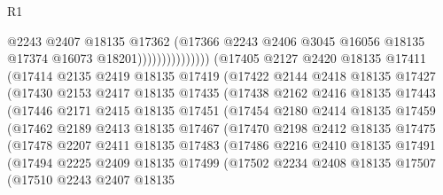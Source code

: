 \begin{lexlean}{R1}
\begin{coremodule}
                                    @2243
                                    @2407
                                    @18135
                                    @17362
                                    (@17366
                                      @2243
                                      @2406
                                      @3045
                                      @16056
                                      @18135
                                      @17374
                                      @16073
                                      @18201)))))))))))))))
        (@17405
          @2127
          @2420
          @18135
          @17411
          (@17414
            @2135
            @2419
            @18135
            @17419
            (@17422
              @2144
              @2418
              @18135
              @17427
              (@17430
                @2153
                @2417
                @18135
                @17435
                (@17438
                  @2162
                  @2416
                  @18135
                  @17443
                  (@17446
                    @2171
                    @2415
                    @18135
                    @17451
                    (@17454
                      @2180
                      @2414
                      @18135
                      @17459
                      (@17462
                        @2189
                        @2413
                        @18135
                        @17467
                        (@17470
                          @2198
                          @2412
                          @18135
                          @17475
                          (@17478
                            @2207
                            @2411
                            @18135
                            @17483
                            (@17486
                              @2216
                              @2410
                              @18135
                              @17491
                              (@17494
                                @2225
                                @2409
                                @18135
                                @17499
                                (@17502
                                  @2234
                                  @2408
                                  @18135
                                  @17507
                                  (@17510
                                    @2243
                                    @2407
                                    @18135

\end{coremodule}
\end{lexlean}
